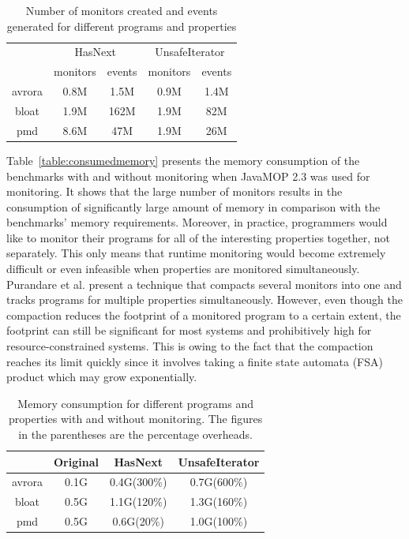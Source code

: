 \begin{table}[t]
\centering
\begin{tabular}{|c|c|c|c|c|}
\hline
\multirow{2}{*}{} & \multicolumn{2}{c|}{HasNext} & \multicolumn{2}{c|}{UnsafeIterator} \\
\cline{2-5} 
                  & monitors     & events        & monitors         & events           \\ \hline
avrora            & 0.8M      & 1.5M       & 0.9M         & 1.4M          \\ \hline
bloat             & 1.9M      & 162M    & 1.9M          & 82M         \\ \hline
pmd               & 8.6M      & 47M      & 1.9M          & 26M         \\ \hline
\end{tabular}
\caption{Number of monitors created and events generated for different programs and properties}
\end{table}
\label{table:numofmonitors}

Table~\ref{table:consumedmemory} presents the memory consumption of the benchmarks with and without monitoring when JavaMOP 2.3 was used for monitoring. It shows that the large number of monitors results in the consumption of significantly large amount of memory in comparison with the benchmarks' memory requirements. Moreover, in practice, programmers would like to monitor their programs for all of the interesting properties together, not separately. This only means that runtime monitoring would become extremely difficult or even infeasible when properties are monitored simultaneously. Purandare et al. present a technique that compacts several monitors into one and tracks programs for multiple properties simultaneously. However, even though the compaction reduces the footprint of a monitored program to a certain extent, the footprint can still be significant for most systems and prohibitively high for resource-constrained systems. This is owing to the fact that the compaction reaches its limit quickly since it involves taking a finite state automata (FSA) product which may grow exponentially.

\begin{table}[t]
\centering
\begin{tabular}{|c|c|c|c|}
\hline
 {} & Original & HasNext & UnsafeIterator\\
 \hline
avrora            & 0.1G      & 0.4G(300\%)       & 0.7G(600\%)           \\ \hline
bloat             & 0.5G      & 1.1G(120\%)    & 1.3G(160\%)              \\ \hline
pmd               & 0.5G      & 0.6G(20\%)     & 1.0G(100\%)             \\ \hline
\end{tabular}
\caption{Memory consumption for different programs and properties with and without monitoring. The figures in the parentheses are the percentage overheads.}
\end{table}
\label{table:consumedmemory}

